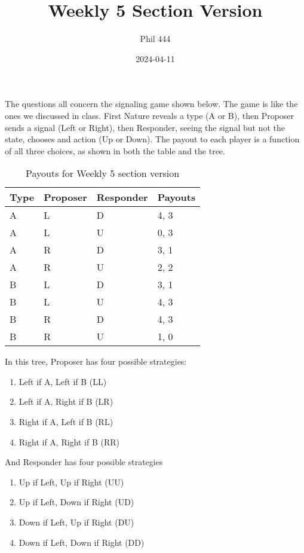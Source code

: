 \documentclass[
  12pt,
  letterpaper,
  DIV=11,
  numbers=noendperiod]{scrartcl}
\title{Weekly 5 Section Version}
\author{Phil 444}
\date{2024-04-11}
\providecommand{\tightlist}{%
  \setlength{\itemsep}{0pt}\setlength{\parskip}{0pt}}\usepackage{longtable,booktabs,array}
\begin{document}
\maketitle

The questions all concern the signaling game shown below. The game is
like the ones we discussed in class. First Nature reveals a type (A or
B), then Proposer sends a signal (Left or Right), then Responder, seeing
the signal but not the state, chooses and action (Up or Down). The
payout to each player is a function of all three choices, as shown in
both the table and the tree.

\begin{longtable}[]{@{}llll@{}}

\caption{\label{tbl-tree-payouts}Payouts for Weekly 5 section version}

\tabularnewline

\toprule\noalign{}
Type & Proposer & Responder & Payouts \\
\midrule\noalign{}
\endhead
\bottomrule\noalign{}
\endlastfoot
A & L & D & 4, 3 \\
A & L & U & 0, 3 \\
A & R & D & 3, 1 \\
A & R & U & 2, 2 \\
B & L & D & 3, 1 \\
B & L & U & 4, 3 \\
B & R & D & 4, 3 \\
B & R & U & 1, 0 \\

\end{longtable}

\newpage

In this tree, Proposer has four possible strategies:

\begin{enumerate}
\def\labelenumi{\arabic{enumi}.}
\tightlist
\item
  Left if A, Left if B (LL)
\item
  Left if A, Right if B (LR)
\item
  Right if A, Left if B (RL)
\item
  Right if A, Right if B (RR)
\end{enumerate}

And Responder has four possible strategies

\begin{enumerate}
\def\labelenumi{\arabic{enumi}.}
\tightlist
\item
  Up if Left, Up if Right (UU)
\item
  Up if Left, Down if Right (UD)
\item
  Down if Left, Up if Right (DU)
\item
  Down if Left, Down if Right (DD)
\end{enumerate}
\end{document}

